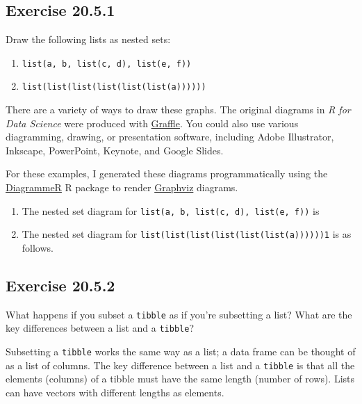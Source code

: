 \documentclass[]{book}
\providecommand{\tightlist}{%
  \setlength{\itemsep}{0pt}\setlength{\parskip}{0pt}}
\theoremstyle{plain}
\theoremstyle{remark}
\begin{document}
\hypertarget{exercise-20.5.1}{%
\subsection*{\texorpdfstring{Exercise
{20.5.1}}{Exercise 20.5.1}}\label{exercise-20.5.1}}

Draw the following lists as nested sets:

\begin{enumerate}
\def\labelenumi{\arabic{enumi}.}
\tightlist
\item
  \texttt{list(a,\ b,\ list(c,\ d),\ list(e,\ f))}
\item
  \texttt{list(list(list(list(list(list(a))))))}
\end{enumerate}

There are a variety of ways to draw these graphs. The original diagrams
in \emph{R for Data Science} were produced with
\href{https://www.omnigroup.com/omnigraffle}{Graffle}. You could also
use various diagramming, drawing, or presentation software, including
Adobe Illustrator, Inkscape, PowerPoint, Keynote, and Google Slides.

For these examples, I generated these diagrams programmatically using
the
\href{http://rich-iannone.github.io/DiagrammeR/graphviz_and_mermaid.html}{DiagrammeR}
R package to render \href{https://www.graphviz.org/}{Graphviz} diagrams.

\begin{enumerate}
\def\labelenumi{\arabic{enumi}.}
\item
  The nested set diagram for
  \texttt{list(a,\ b,\ list(c,\ d),\ list(e,\ f))} is
\item
  The nested set diagram for
  \texttt{list(list(list(list(list(list(a))))))1} is as follows.
\end{enumerate}

\hypertarget{exercise-20.5.2}{%
\subsection*{\texorpdfstring{Exercise
{20.5.2}}{Exercise 20.5.2}}\label{exercise-20.5.2}}

What happens if you subset a \texttt{tibble} as if you're subsetting a
list? What are the key differences between a list and a \texttt{tibble}?

Subsetting a \texttt{tibble} works the same way as a list; a data frame
can be thought of as a list of columns. The key difference between a
list and a \texttt{tibble} is that all the elements (columns) of a
tibble must have the same length (number of rows). Lists can have
vectors with different lengths as elements.
\end{document}
